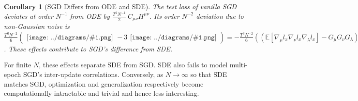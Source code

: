 \documentclass{article}
\theoremstyle{plain}
\newtheorem{cor}{Corollary}
\theoremstyle{definition}
\newcommand{\expct}[1]{\mathbb{E}\left[#1\right]}
\newcommand{\wrap}[1]{\left(#1\right)}
\newcommand{\sdia}[1]{\begin{gathered}\texttt{[image: ../diagrams/\#1.png]}\end{gathered}}
\begin{document}
        \begin{cor}[SGD Differs from ODE and SDE] \label{cor:vsode}
            The test loss of vanilla SGD deviates at order $N^{-1}$ from
            ODE by
            $
                \frac{T^2 N^{-1}}{2} ~ C_{\mu\nu} H^{\mu\nu}
            $.
            Its order $N^{-2}$ deviation due to non-Gaussian noise is
            $
                \frac{T^3 N^{-2}}{6} \wrap{
                    \sdia{c(012-3)(03-13-23)}
                    -
                    3 \sdia{c(01-2-3)(03-13-23)}
                }
                =
                -
                \frac{T^3 N^{-2}}{6}  
                \wrap{
                    \wrap{
                        \expct{\nabla_\mu l_x \nabla_\nu l_x \nabla_\lambda l_x}-
                        G_\mu G_\nu G_\lambda
                    }
                    J^{\mu\nu\lambda}
                    - 
                    3
                    C_{\mu \nu} G_\lambda J^{\mu\nu\lambda}
                }
            $.
            These effects contribute to SGD's difference from SDE.
        \end{cor}
        For finite $N$, these effects separate SDE from SGD.  SDE also fails to
        model multi-epoch SGD's inter-update correlations.  Conversely, as
        $N\to\infty$ so that SDE matches SGD, optimization and generalization
        respectively become computationally intractable and trivial and hence
        less interesting.
    
\end{document}
